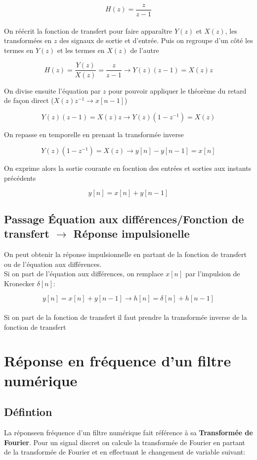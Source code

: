 \documentclass[11pt,a4paper]{article}
\begin{document}
\[ H(z) = \frac{z}{z-1}  \]\\

On réécrit la fonction de transfert pour faire apparaître $Y(z)$ et $X(z)$, les transformées en $z$ des signaux de sortie et d'entrée. Puis on regroupe d'un côté les termes en $Y(z)$ et les termes en $X(z)$ de l'autre

\[ H(z) = \frac{Y(z)}{X(z)} = \frac{z}{z-1} \rightarrow Y(z) (z-1)  =  X(z) z\]

On divise ensuite l'équation par  $z$ pour pouvoir appliquer le théorème du retard de façon direct ($X(z)z^{-1} \rightarrow x[n-1]$)

\[ Y(z) (z-1)  =  X(z) z \rightarrow Y(z) (1-z^{-1})  =  X(z)  \]

On repasse en temporelle en prenant la transformée inverse

\[ Y(z) (1-z^{-1})  =  X(z) \rightarrow y[n] - y[n-1] = x[n]  \]

On exprime alors la sortie courante en focntion des entrées et sorties aux instants précédents

\[ \boxed{ y[n] = x[n] + y[n-1]}  \]

\subsection{Passage \'Equation aux différences/Fonction de transfert $\rightarrow$ Réponse impulsionelle}
On peut obtenir la réponse impulsionnelle en partant de la fonction de transfert ou de l'équation aux différences.\\

Si on part de l'équation aux différences, on remplace $x[n]$ par l'impulsion de Kronecker $\delta [n]$:

\[ y[n] = x[n] + y[n-1] \rightarrow h[n] = \delta [n] + h[n-1] \]\\

Si on part de la fonction de transfert il faut prendre la transformée inverse de la fonction de transfert 

\section{Réponse en fréquence d'un filtre numérique}
\subsection{Défintion} 
La réponseen fréquence d'un filtre numérique fait référence à sa \textbf{Transformée de Fourier}. Pour un signal discret on calcule la transformée de Fourier en partant de la transformée de Fourier et en effectuant le changement de variable suivant:
\end{document}
